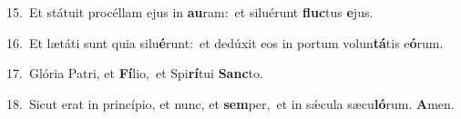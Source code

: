 {\numbfont\textcolor{\numbcolor}{15.}}~Et státuit procéllam ejus in \textbf{au}\-ram:~\star et siluérunt \textbf{fluc}\-tus \textbf{e}\-jus.\par
{\numbfont\textcolor{\numbcolor}{16.}}~Et lætáti sunt quia silu\-\textbf{é}\-runt:~\star et dedúxit eos in portum volun\-\textbf{tá}\-tis e\-\textbf{ó}\-rum.\par
{\numbfont\textcolor{\numbcolor}{17.}}~Glória Patri, et \textbf{Fí}\-lio,~\star et Spi\-\textbf{rí}\-tui \textbf{Sanc}\-to.\par
{\numbfont\textcolor{\numbcolor}{18.}}~Sicut erat in princípio, et nunc, et \textbf{sem}\-per,~\star et in sǽcula sæcu\-\textbf{ló}\-rum. \textbf{A}\-men.\par
